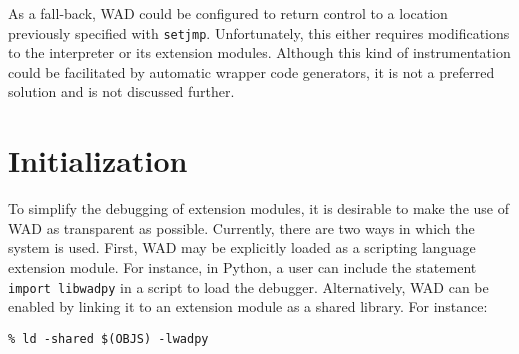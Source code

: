 
As a fall-back, WAD could be configured to return control to a location
previously specified with {\tt setjmp}.  Unfortunately, this either
requires modifications to the interpreter or its extension modules.
Although this kind of instrumentation could be facilitated by automatic
wrapper code generators, it is not a preferred solution and is not discussed further.

\section{Initialization}

To simplify the debugging of extension modules, it
is desirable to make the use of WAD as transparent as possible.
Currently, there are two ways in which the system is used.  First, WAD
may be explicitly loaded as a scripting language extension module.
For instance, in Python, a user can include the statement {\tt import
libwadpy} in a script to load the debugger.  Alternatively, WAD can be
enabled by linking it to an extension module as a shared
library.  For instance:

\begin{verbatim}
% ld -shared $(OBJS) -lwadpy
\end{verbatim}

